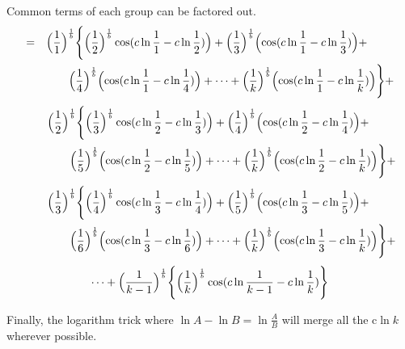 \documentclass{amsart}
\begin{document}
	Common terms of each group can be factored out.
	\[
	\begin{aligned}
		= \quad & \Bigl( \frac{1}{1} \Bigr)^\frac1b \Biggl\{ \Bigl( \frac{1}{2} \Bigr)^\frac1b \cos(c \ln \frac{1}{1} - c \ln \frac{1}{2}) \Bigr) + \Bigl( \frac{1}{3} \Bigr)^\frac1b \Bigl( \cos(c \ln \frac{1}{1} - c \ln \frac{1}{3}) \Bigr) + \\
		& \qquad \Bigl( \frac{1}{4} \Bigr)^\frac1b \Bigl( \cos(c \ln \frac{1}{1} - c \ln \frac{1}{4}) \Bigr) + \dots  + \Bigl( \frac{1}{k} \Bigr)^\frac1b \Bigl( \cos(c \ln \frac{1}{1} - c \ln \frac{1}{k}) \Bigr) \Biggr\} + 
	\end{aligned}
	\]
	\[
	\begin{aligned}
		\quad\quad & \Bigl( \frac{1}{2}  \Bigr)^\frac1b \Biggl\{ \Bigl( \frac{1}{3} \Bigr)^\frac1b \cos(c \ln \frac{1}{2} - c \ln \frac{1}{3}) \Bigr) + \Bigl( \frac{1}{4} \Bigr)^\frac1b \Bigl( \cos(c \ln \frac{1}{2} - c \ln \frac{1}{4}) \Bigr) + \\
		& \qquad \Bigl( \frac{1}{5} \Bigr)^\frac1b \Bigl( \cos(c \ln \frac{1}{2} - c \ln \frac{1}{5}) \Bigr) + \dots  + \Bigl( \frac{1}{k} \Bigr)^\frac1b \Bigl( \cos(c \ln \frac{1}{2} - c \ln \frac{1}{k}) \Bigr) \Biggr\} + 
	\end{aligned}
	\]
	\[
	\begin{aligned}
		\quad\quad & \Bigl( \frac{1}{3} \Bigr)^\frac1b \Biggl\{ \Bigl( \frac{1}{4} \Bigr)^\frac1b \cos(c \ln \frac{1}{3} - c \ln \frac{1}{4}) \Bigr) + \Bigl( \frac{1}{5} \Bigr)^\frac1b \Bigl( \cos(c \ln \frac{1}{3} - c \ln \frac{1}{5}) \Bigr) + \\
		& \qquad \Bigl( \frac{1}{6} \Bigr)^\frac1b \Bigl( \cos(c \ln \frac{1}{3} - c \ln \frac{1}{6}) \Bigr) + \dots  + \Bigl( \frac{1}{k} \Bigr)^\frac1b \Bigl( \cos(c \ln \frac{1}{3} - c \ln \frac{1}{k}) \Bigr) \Biggr\} + 
	\end{aligned}
	\]
	\[ \dots + \Bigl( \frac{1}{k-1} \Bigr)^\frac1b \Biggl\{ \Bigl( \frac{1}{k} \Bigr)^\frac1b \cos(c \ln \frac{1}{k-1} - c \ln \frac{1}{k}) \Biggr\} \]
	
	Finally, the logarithm trick where $ \ln{A} - \ln{B} = \ln{\frac{A}{B}} $ will merge all the c$\ln k$ wherever possible.
	
\end{document}
